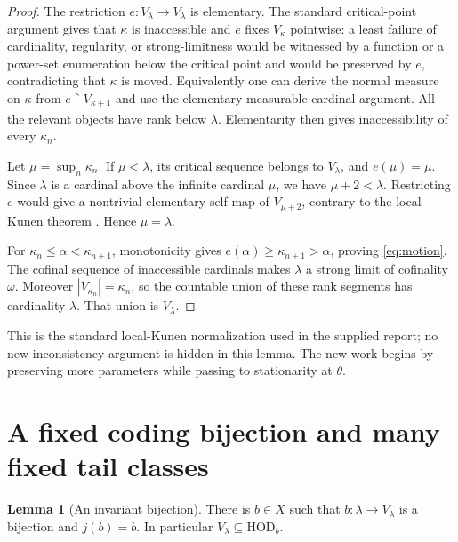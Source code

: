 \documentclass[11pt,letterpaper]{article}
\theoremstyle{definition}
\newtheorem{lemma}[definition]{Lemma}
\numberwithin{equation}{section}
\newcommand{\HOD}{\mathrm{HOD}}
\newcommand{\restr}{\mathbin{\upharpoonright}}
\begin{document}
\begin{proof}
The restriction $e:V_\lambda\to V_\lambda$ is elementary. The standard critical-point argument gives that $\kappa$ is inaccessible and $e$ fixes $V_\kappa$ pointwise: a least failure of cardinality, regularity, or strong-limitness would be witnessed by a function or a power-set enumeration below the critical point and would be preserved by $e$, contradicting that $\kappa$ is moved. Equivalently one can derive the normal measure on $\kappa$ from $e\restr V_{\kappa+1}$ and use the elementary measurable-cardinal argument. All the relevant objects have rank below $\lambda$. Elementarity then gives inaccessibility of every $\kappa_n$.

Let $\mu=\sup_n\kappa_n$. If $\mu<\lambda$, its critical sequence belongs to $V_\lambda$, and $e(\mu)=\mu$. Since $\lambda$ is a cardinal above the infinite cardinal $\mu$, we have $\mu+2<\lambda$. Restricting $e$ would give a nontrivial elementary self-map of $V_{\mu+2}$, contrary to the local Kunen theorem \cite{kunen}. Hence $\mu=\lambda$.

For $\kappa_n\leq\alpha<\kappa_{n+1}$, monotonicity gives $e(\alpha)\geq\kappa_{n+1}>\alpha$, proving \eqref{eq:motion}. The cofinal sequence of inaccessible cardinals makes $\lambda$ a strong limit of cofinality $\omega$. Moreover $|V_{\kappa_n}|=\kappa_n$, so the countable union of these rank segments has cardinality $\lambda$. That union is $V_\lambda$.
\end{proof}

This is the standard local-Kunen normalization used in the supplied report; no new inconsistency argument is hidden in this lemma. The new work begins by preserving more parameters while passing to stationarity at $\theta$.

\section{A fixed coding bijection and many fixed tail classes}\label{sec:fixed}

\begin{lemma}[An invariant bijection]\label{lem:b}
There is $b\in X$ such that $b:\lambda\to V_\lambda$ is a bijection and $j(b)=b$. In particular $V_\lambda\subseteq\HOD_b$.
\end{lemma}
\end{document}
